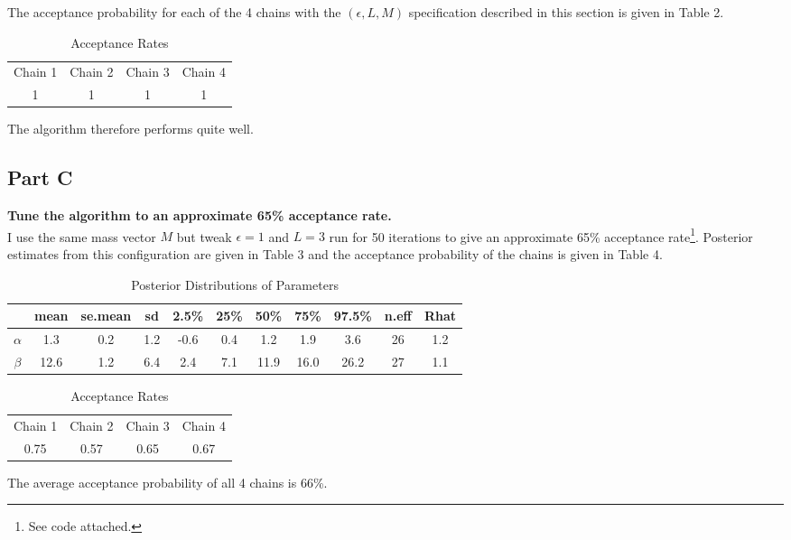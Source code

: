 \documentclass{article}
\begin{document}
The acceptance probability for each of the 4 chains with the $(\epsilon, L, M)$ specification described in this section is given in Table 2.
\begin{table} [H]
\caption {Acceptance Rates}
\vspace{2mm}
\def\arraystretch{1}
\centering 
\begin{tabular}{c c c c} 
\hline 
Chain 1 & Chain 2 & Chain 3 & Chain 4 \\
1 & 1 & 1& 1 \\
\end{tabular}
\end{table}
The algorithm therefore performs quite well.
\subsection{Part C}
\textbf{Tune the algorithm to an approximate 65\% acceptance rate.}\\
I use the same mass vector $M$ but tweak $\epsilon = 1$ and $L = 3$  run for 50 iterations to give an approximate 65\% acceptance rate\footnote{See code attached.}. Posterior estimates from this configuration are given in Table 3 and the acceptance probability of the chains is given in Table 4.
\begin{table} [H]
\caption {Posterior Distributions of Parameters}
\vspace{2mm}
\def\arraystretch{1.5}
\centering \begin{tabular}{c c c c c c c c c c c} 
\hline\hline 
\vspace{1mm}
 & mean & se.mean  &  sd   & 2.5\%  &  25\% &   50\% &   75\% & 97.5\% & n.eff & Rhat \\  [0.5ex] \hline
$\alpha$   &   	1.3   &  0.2 &1.2 &-0.6 &0.4 & 1.2 & 1.9 &  3.6  &  26 & 1.2\\
$\beta$    &   	12.6  &   1.2 &6.4 & 2.4 &7.1 &11.9& 16.0 & 26.2 &   27 & 1.1
 \\
\hline 
\end{tabular}
\end{table}
\begin{table} [H]
\caption {Acceptance Rates}
\vspace{2mm}
\def\arraystretch{1}
\centering 
\begin{tabular}{c c c c} 
\hline 
Chain 1 & Chain 2 & Chain 3 & Chain 4 \\
0.75 & 0.57 & 0.65 & 0.67 \\
\end{tabular}
\end{table}
The average acceptance probability of all 4 chains is 66\%.
\end{document}
